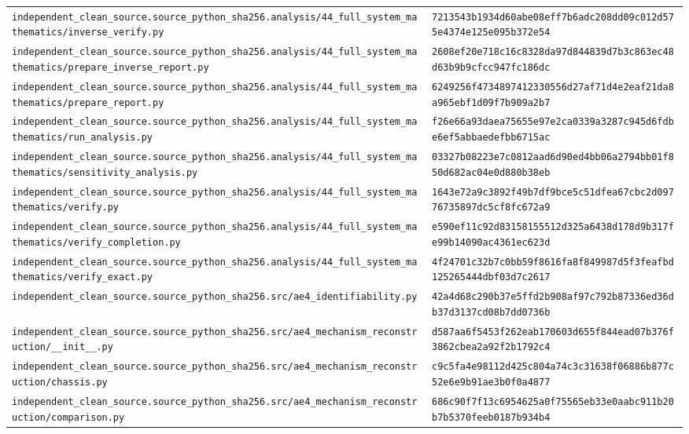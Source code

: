 \begin{longtable}{p{.46\linewidth}p{.46\linewidth}}
\nolinkurl{independent_clean_source.source_python_sha256.analysis/44_full_system_mathematics/inverse_verify.py} & \nolinkurl{7213543b1934d60abe08eff7b6adc208dd09c012d575e4374e125e095b372e54} \\
\nolinkurl{independent_clean_source.source_python_sha256.analysis/44_full_system_mathematics/prepare_inverse_report.py} & \nolinkurl{2608ef20e718c16c8328da97d844839d7b3c863ec48d63b9b9cfcc947fc186dc} \\
\nolinkurl{independent_clean_source.source_python_sha256.analysis/44_full_system_mathematics/prepare_report.py} & \nolinkurl{6249256f4734897412330556d27af71d4e2eaf21da8a965ebf1d09f7b909a2b7} \\
\nolinkurl{independent_clean_source.source_python_sha256.analysis/44_full_system_mathematics/run_analysis.py} & \nolinkurl{f26e66a93daea75655e97e2ca0339a3287c945d6fdbe6ef5abbaedefbb6715ac} \\
\nolinkurl{independent_clean_source.source_python_sha256.analysis/44_full_system_mathematics/sensitivity_analysis.py} & \nolinkurl{03327b08223e7c0812aad6d90ed4bb06a2794bb01f850d682ac04e0d880b38eb} \\
\nolinkurl{independent_clean_source.source_python_sha256.analysis/44_full_system_mathematics/verify.py} & \nolinkurl{1643e72a9c3892f49b7df9bce5c51dfea67cbc2d09776735897dc5cf8fc672a9} \\
\nolinkurl{independent_clean_source.source_python_sha256.analysis/44_full_system_mathematics/verify_completion.py} & \nolinkurl{e590ef11c92d83158155512d325a6438d178d9b317fe99b14090ac4361ec623d} \\
\nolinkurl{independent_clean_source.source_python_sha256.analysis/44_full_system_mathematics/verify_exact.py} & \nolinkurl{4f24701c32b7c0bb59f8616fa8f849987d5f3feafbd125265444dbf03d7c2617} \\
\nolinkurl{independent_clean_source.source_python_sha256.src/ae4_identifiability.py} & \nolinkurl{42a4d68c290b37e5ffd2b908af97c792b87336ed36db37d3137cd08b7dd0736b} \\
\nolinkurl{independent_clean_source.source_python_sha256.src/ae4_mechanism_reconstruction/__init__.py} & \nolinkurl{d587aa6f5453f262eab170603d655f844ead07b376f3862cbea2a92f2b1792c4} \\
\nolinkurl{independent_clean_source.source_python_sha256.src/ae4_mechanism_reconstruction/chassis.py} & \nolinkurl{c9c5fa4e98112d425c804a74c3c31638f06886b877c52e6e9b91ae3b0f0a4877} \\
\nolinkurl{independent_clean_source.source_python_sha256.src/ae4_mechanism_reconstruction/comparison.py} & \nolinkurl{686c90f7f13c6954625a0f75565eb33e0aabc911b20b7b5370feeb0187b934b4} \\

\end{longtable}
